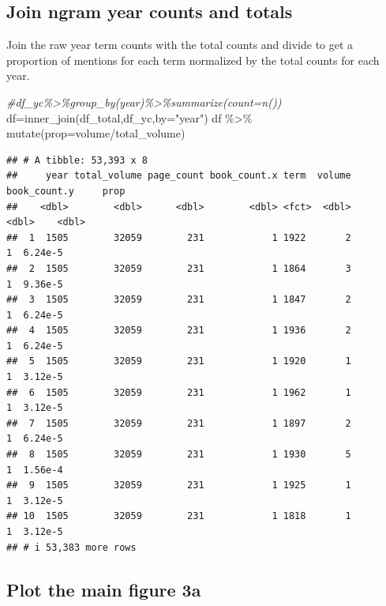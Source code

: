 \documentclass[
]{article}
\newenvironment{Shaded}{\begin{snugshade}}{\end{snugshade}}
\newcommand{\AttributeTok}[1]{\textcolor[rgb]{0.77,0.63,0.00}{#1}}
\newcommand{\CommentTok}[1]{\textcolor[rgb]{0.56,0.35,0.01}{\textit{#1}}}
\newcommand{\FunctionTok}[1]{\textcolor[rgb]{0.00,0.00,0.00}{#1}}
\newcommand{\NormalTok}[1]{#1}
\newcommand{\OtherTok}[1]{\textcolor[rgb]{0.56,0.35,0.01}{#1}}
\newcommand{\SpecialCharTok}[1]{\textcolor[rgb]{0.00,0.00,0.00}{#1}}
\newcommand{\StringTok}[1]{\textcolor[rgb]{0.31,0.60,0.02}{#1}}
\begin{document}
\hypertarget{join-ngram-year-counts-and-totals}{%
\subsection{Join ngram year counts and
totals}\label{join-ngram-year-counts-and-totals}}

Join the raw year term counts with the total counts and divide to get a
proportion of mentions for each term normalized by the total counts for
each year.

\begin{Shaded}
\begin{Highlighting}[]
\CommentTok{\#df\_yc\%\textgreater{}\%group\_by(year)\%\textgreater{}\%summarize(count=n())}
\NormalTok{df}\OtherTok{=}\FunctionTok{inner\_join}\NormalTok{(df\_total,df\_yc,}\AttributeTok{by=}\StringTok{"year"}\NormalTok{)}
\NormalTok{df }\SpecialCharTok{\%\textgreater{}\%} \FunctionTok{mutate}\NormalTok{(}\AttributeTok{prop=}\NormalTok{volume}\SpecialCharTok{/}\NormalTok{total\_volume)}
\end{Highlighting}
\end{Shaded}

\begin{verbatim}
## # A tibble: 53,393 x 8
##     year total_volume page_count book_count.x term  volume book_count.y     prop
##    <dbl>        <dbl>      <dbl>        <dbl> <fct>  <dbl>        <dbl>    <dbl>
##  1  1505        32059        231            1 1922       2            1  6.24e-5
##  2  1505        32059        231            1 1864       3            1  9.36e-5
##  3  1505        32059        231            1 1847       2            1  6.24e-5
##  4  1505        32059        231            1 1936       2            1  6.24e-5
##  5  1505        32059        231            1 1920       1            1  3.12e-5
##  6  1505        32059        231            1 1962       1            1  3.12e-5
##  7  1505        32059        231            1 1897       2            1  6.24e-5
##  8  1505        32059        231            1 1930       5            1  1.56e-4
##  9  1505        32059        231            1 1925       1            1  3.12e-5
## 10  1505        32059        231            1 1818       1            1  3.12e-5
## # i 53,383 more rows
\end{verbatim}

\hypertarget{plot-the-main-figure-3a}{%
\subsection{Plot the main figure 3a}\label{plot-the-main-figure-3a}}
\end{document}

